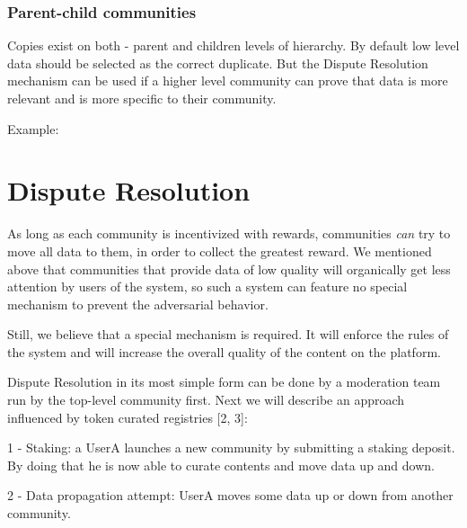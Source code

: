 \documentclass[10pt,a4paper]{article}
\begin{document}
\subsubsection{Parent-child communities}
Copies exist on both - parent and children levels of hierarchy. By default low level data should be selected as the correct duplicate. But the Dispute Resolution mechanism can be used if a higher level community can prove that data is more relevant and is more specific to their community.

Example:


\section{Dispute Resolution}

As long as each community is incentivized with rewards, communities {\it can} try to move all data to them, in order to collect the greatest reward. We mentioned above that communities that provide data of low quality will organically get less attention by users of the system, so such a system can feature no special mechanism to prevent the adversarial behavior.

Still, we believe that a special mechanism is required. It will enforce the rules of the system and will increase the overall quality of the content on the platform.\newline

Dispute Resolution in its most simple form can be done by a moderation team run by the top-level community first. Next we will describe an approach influenced by token curated registries [2, 3]:

1 - Staking: a UserA launches a new community by submitting a staking deposit. By doing that he is now able to curate contents and move data up and down.

2 - Data propagation attempt: UserA moves some data up or down from another community.
\end{document}
